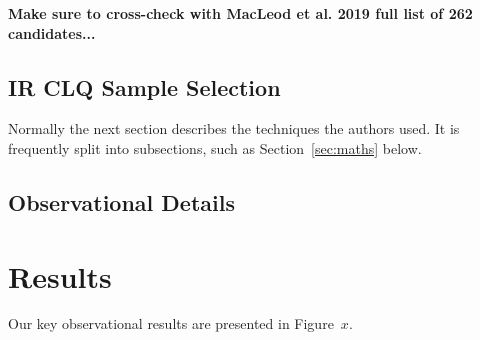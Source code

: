 \documentclass[a4paper,fleqn,usenatbib]{mnras}
\begin{document}





{\bf Make sure to cross-check with MacLeod et al. 2019 
full list of 262 candidates...}


\subsection{IR CLQ Sample Selection}
Normally the next section describes the techniques the authors used.
It is frequently split into subsections, such as Section~\ref{sec:maths} below.

\subsection{Observational Details}




\section{Results}\label{sec:results} 
Our key observational results are presented in Figure~$x$. 
\end{document}
